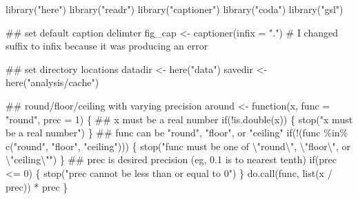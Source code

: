 \documentclass[
  11pt,
]{article}
\newenvironment{Shaded}{}{}
\newcommand{\AttributeTok}[1]{#1}
\newcommand{\CommentTok}[1]{\textcolor[rgb]{0.00,0.50,0.00}{#1}}
\newcommand{\ControlFlowTok}[1]{\textcolor[rgb]{0.00,0.00,1.00}{#1}}
\newcommand{\DecValTok}[1]{#1}
\newcommand{\DocumentationTok}[1]{\textcolor[rgb]{0.00,0.50,0.00}{#1}}
\newcommand{\FunctionTok}[1]{#1}
\newcommand{\NormalTok}[1]{#1}
\newcommand{\OtherTok}[1]{\textcolor[rgb]{1.00,0.25,0.00}{#1}}
\newcommand{\SpecialCharTok}[1]{\textcolor[rgb]{0.00,0.50,0.50}{#1}}
\newcommand{\StringTok}[1]{\textcolor[rgb]{0.00,0.50,0.50}{#1}}
\begin{document}
\begin{Shaded}
\begin{Highlighting}[]
\FunctionTok{library}\NormalTok{(}\StringTok{"here"}\NormalTok{)}
\FunctionTok{library}\NormalTok{(}\StringTok{"readr"}\NormalTok{)}
\FunctionTok{library}\NormalTok{(}\StringTok{"captioner"}\NormalTok{)}
\FunctionTok{library}\NormalTok{(}\StringTok{"coda"}\NormalTok{)}
\FunctionTok{library}\NormalTok{(}\StringTok{"gsl"}\NormalTok{)}

\DocumentationTok{\#\# set default caption delimter}
\NormalTok{fig\_cap }\OtherTok{\textless{}{-}} \FunctionTok{captioner}\NormalTok{(}\AttributeTok{infix =} \StringTok{"."}\NormalTok{) }\CommentTok{\# I changed suffix to infix because it was producing an error}

\DocumentationTok{\#\# set directory locations}
\NormalTok{datadir }\OtherTok{\textless{}{-}} \FunctionTok{here}\NormalTok{(}\StringTok{"data"}\NormalTok{)}
\NormalTok{savedir }\OtherTok{\textless{}{-}} \FunctionTok{here}\NormalTok{(}\StringTok{"analysis/cache"}\NormalTok{)}

\DocumentationTok{\#\# round/floor/ceiling with varying precision}
\NormalTok{around }\OtherTok{\textless{}{-}} \ControlFlowTok{function}\NormalTok{(x, }\AttributeTok{func =} \StringTok{"round"}\NormalTok{, }\AttributeTok{prec =} \DecValTok{1}\NormalTok{) \{}
  \DocumentationTok{\#\# \textasciigrave{}x\textasciigrave{} must be a real number}
  \ControlFlowTok{if}\NormalTok{(}\SpecialCharTok{!}\FunctionTok{is.double}\NormalTok{(x)) \{}
    \FunctionTok{stop}\NormalTok{(}\StringTok{"\textasciigrave{}x\textasciigrave{} must be a real number"}\NormalTok{)}
\NormalTok{  \}}
  \DocumentationTok{\#\# \textasciigrave{}func\textasciigrave{} can be "round", "floor", or "ceiling"}
  \ControlFlowTok{if}\NormalTok{(}\SpecialCharTok{!}\NormalTok{(func }\SpecialCharTok{\%in\%} \FunctionTok{c}\NormalTok{(}\StringTok{"round"}\NormalTok{, }\StringTok{"floor"}\NormalTok{, }\StringTok{"ceiling"}\NormalTok{))) \{}
    \FunctionTok{stop}\NormalTok{(}\StringTok{"\textasciigrave{}func\textasciigrave{} must be one of }\SpecialCharTok{\textbackslash{}"}\StringTok{round}\SpecialCharTok{\textbackslash{}"}\StringTok{, }\SpecialCharTok{\textbackslash{}"}\StringTok{floor}\SpecialCharTok{\textbackslash{}"}\StringTok{, or }\SpecialCharTok{\textbackslash{}"}\StringTok{ceiling}\SpecialCharTok{\textbackslash{}"}\StringTok{"}\NormalTok{)}
\NormalTok{  \}}
  \DocumentationTok{\#\# \textasciigrave{}prec\textasciigrave{} is desired precision (eg, 0.1 is to nearest tenth)}
  \ControlFlowTok{if}\NormalTok{(prec }\SpecialCharTok{\textless{}=} \DecValTok{0}\NormalTok{) \{}
    \FunctionTok{stop}\NormalTok{(}\StringTok{"\textasciigrave{}prec\textasciigrave{} cannot be less than or equal to 0"}\NormalTok{)}
\NormalTok{  \}}
  \FunctionTok{do.call}\NormalTok{(func, }\FunctionTok{list}\NormalTok{(x }\SpecialCharTok{/}\NormalTok{ prec)) }\SpecialCharTok{*}\NormalTok{ prec}
\NormalTok{\}}
\end{Highlighting}
\end{Shaded}
\end{document}
